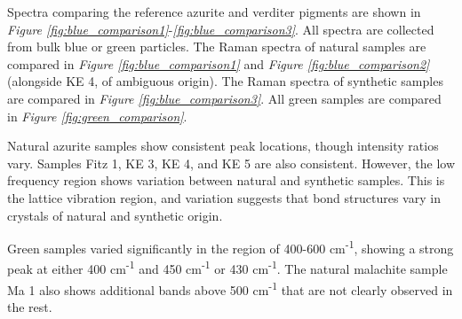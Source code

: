 Spectra comparing the reference azurite and verditer pigments are shown in \textit{Figure \ref{fig:blue_comparison1}}-\textit{\ref{fig:blue_comparison3}}. All spectra are collected from bulk blue or green particles. The Raman spectra of natural samples are compared in \textit{Figure \ref{fig:blue_comparison1}} and \textit{Figure \ref{fig:blue_comparison2}} (alongside KE 4, of ambiguous origin). The Raman spectra of synthetic samples are compared in \textit{Figure \ref{fig:blue_comparison3}}. All green samples are compared in \textit{Figure \ref{fig:green_comparison}}.

Natural azurite samples show consistent peak locations, though intensity ratios vary. Samples Fitz 1, KE 3, KE 4, and KE 5 are also consistent. However, the low frequency region shows variation between natural and synthetic samples. This is the lattice vibration region, and variation suggests that bond structures vary in crystals of natural and synthetic origin.

Green samples varied significantly in the region of 400-600 cm\textsuperscript{-1}, showing a strong peak at either 400 cm\textsuperscript{-1} and 450 cm\textsuperscript{-1} or 430 cm\textsuperscript{-1}. The natural malachite sample Ma 1 also shows additional bands above 500 cm\textsuperscript{-1} that are not clearly observed in the rest. 


